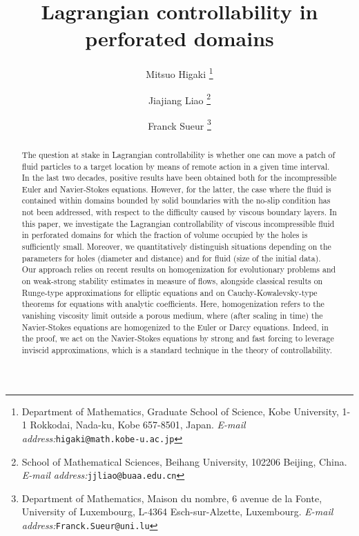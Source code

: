 \documentclass[11pt,a4paper]{article}
\numberwithin{equation}{section}
\begin{document}
\title{Lagrangian controllability in perforated domains}


\author{
Mitsuo Higaki
\thanks{
Department of Mathematics, 
Graduate School of Science, 
Kobe University, 
1-1 Rokkodai, Nada-ku, Kobe 657-8501, Japan.
\textit{E-mail address:}\texttt{higaki@math.kobe-u.ac.jp}
}
\and
Jiajiang Liao
\thanks{
School of Mathematical Sciences, 
Beihang University, 
102206 Beijing, China.
\textit{E-mail address:}\texttt{jjliao@buaa.edu.cn}
}
\and
Franck Sueur
\thanks{
Department of Mathematics, 
Maison du nombre, 6 avenue de la Fonte, 
University of Luxembourg,  
L-4364 Esch-sur-Alzette, Luxembourg.
\textit{E-mail address:}\texttt{Franck.Sueur@uni.lu}
}
}
\date{}


    \maketitle


\begin{abstract} 
The question at stake in Lagrangian controllability is whether one can move a patch of fluid particles to a target location by means of remote action in a given time interval. In the last two decades, positive results have been obtained both for the incompressible Euler and Navier-Stokes equations. However, for the latter, the case where the fluid is contained within domains bounded by solid boundaries with the no-slip condition has not been addressed, with respect to the difficulty caused by viscous boundary layers. In this paper, we investigate the Lagrangian controllability of viscous incompressible fluid in perforated domains for which the fraction of volume occupied by the holes is sufficiently small. Moreover, we quantitatively distinguish situations depending on the parameters for holes (diameter and distance) and for fluid (size of the initial data). Our approach relies on recent results on homogenization for evolutionary problems and on weak-strong stability estimates in measure of flows, alongside classical results on Runge-type approximations for elliptic equations and on Cauchy-Kowalevsky-type theorems for equations with analytic coefficients. Here, homogenization refers to the vanishing viscosity limit outside a porous medium, where (after scaling in time) the Navier-Stokes equations are homogenized to the Euler or Darcy equations. Indeed, in the proof, we act on the Navier-Stokes equations by strong and fast forcing to leverage inviscid approximations, which is a standard technique in the theory of controllability.
\end{abstract}
\end{document}
